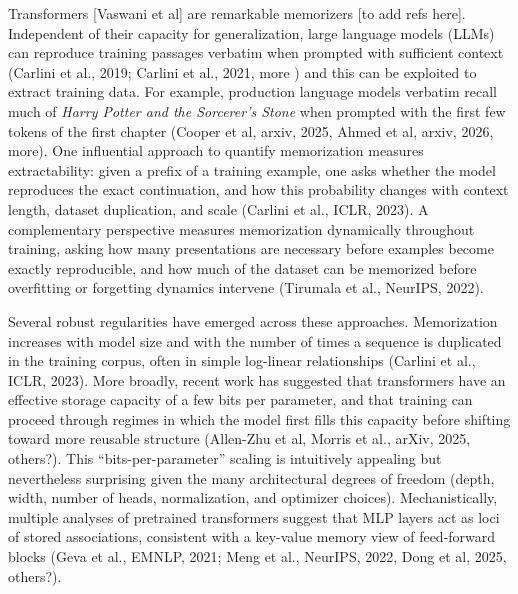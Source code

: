 \documentclass{article}
\theoremstyle{plain}
\theoremstyle{definition}
\theoremstyle{remark}
\begin{document}
Transformers [Vaswani et al] are remarkable memorizers [to add refs here]. Independent of their capacity for generalization, large language models (LLMs) can reproduce training passages verbatim when prompted with sufficient context (Carlini et al., 2019; Carlini et al., 2021, more ) and this can be exploited to extract training data. For example, production language models verbatim recall much of \emph{Harry Potter and the Sorcerer's Stone} when prompted with the first few tokens of the first chapter  (Cooper et al, arxiv, 2025, Ahmed et al, arxiv, 2026, more). One influential approach to quantify memorization measures extractability: given a prefix of a training example, one asks whether the model reproduces the exact continuation, and how this probability changes with context length, dataset duplication, and scale (Carlini et al., ICLR, 2023). A complementary perspective measures memorization dynamically throughout training, asking how many presentations are necessary before examples become exactly reproducible, and how much of the dataset can be memorized before overfitting or forgetting dynamics intervene (Tirumala et al., NeurIPS, 2022). 

Several robust regularities have emerged across these approaches. Memorization increases with model size and with the number of times a sequence is duplicated in the training corpus, often in simple log-linear relationships (Carlini et al., ICLR, 2023). More broadly, recent work has suggested that transformers have an effective storage capacity of a few bits per parameter, and that training can proceed through regimes in which the model first fills this capacity before shifting toward more reusable structure (Allen-Zhu et al, Morris et al., arXiv, 2025, others?). This ``bits-per-parameter'' scaling is intuitively appealing but nevertheless surprising given the many architectural degrees of freedom (depth, width, number of heads, normalization, and optimizer choices). Mechanistically, multiple analyses of pretrained transformers suggest that MLP layers act as loci of stored associations, consistent with a key-value memory view of feed-forward blocks (Geva et al., EMNLP, 2021; Meng et al., NeurIPS, 2022, Dong et al, 2025, others?). 
\end{document}
